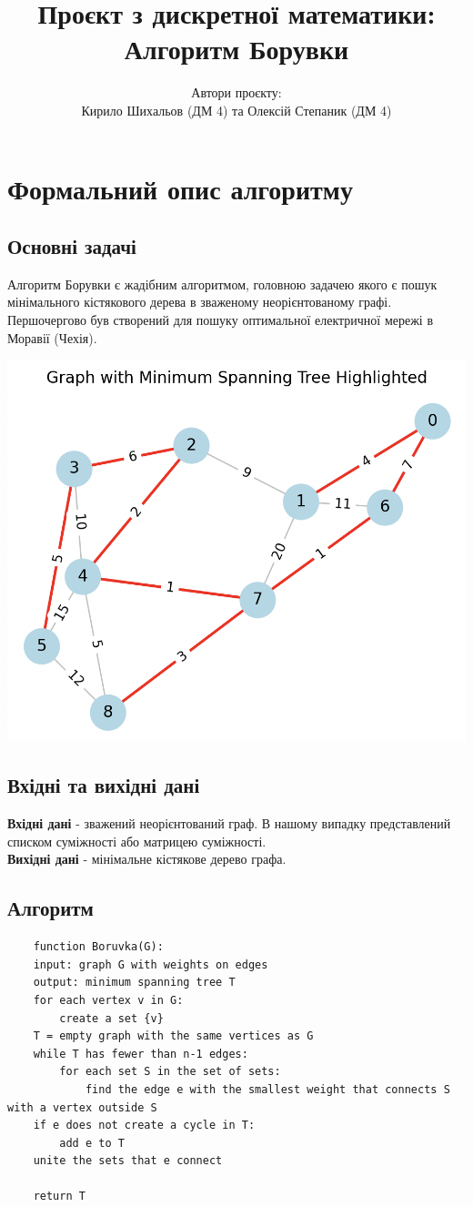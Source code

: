 \documentclass[titlepage, a4paper]{article}
\title{Проєкт з дискретної математики: 
	Алгоритм Борувки}
\author{Автори проєкту: \\
Кирило Шихальов (ДМ 4) та Олексій Степаник (ДМ 4)}
\date{}
\begin{document}
\maketitle
\section{Формальний опис алгоритму}
\subsection{Основні задачі}
Алгоритм Борувки є жадібним алгоритмом, головною задачею якого є пошук мінімального кістякового дерева в зваженому неорієнтованому графі.
Першочергово був створений для пошуку оптимальної електричної мережі в Моравії (Чехія).

\includegraphics{graph.png}
\subsection{Вхідні та вихідні дані}

\textbf{Вхідні дані} - зважений неорієнтований граф. В нашому випадку представлений списком суміжності або матрицею суміжності.\\
\textbf{Вихідні дані} - мінімальне кістякове дерево графа.

\subsection{Алгоритм}
\begin{verbatim}	
	function Boruvka(G):
	input: graph G with weights on edges
	output: minimum spanning tree T
	for each vertex v in G:
		create a set {v}
	T = empty graph with the same vertices as G
	while T has fewer than n-1 edges:
		for each set S in the set of sets:
			find the edge e with the smallest weight that connects S with a vertex outside S
	if e does not create a cycle in T:
		add e to T
	unite the sets that e connect
	
	return T
\end{verbatim}
\end{document}
